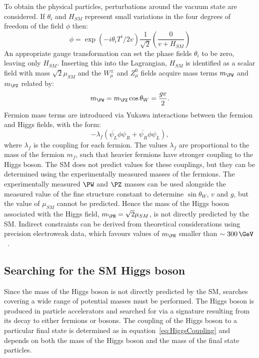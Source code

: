 To obtain the physical particles, perturbations around the vacuum state are
considered. If $\theta_{i}$ and $H_{SM}$ represent small variations in the four
degrees of freedom of the field $\phi$ then:
\begin{equation}
\phi = \exp(-i\theta_{i}T^{i}/2v)\frac{1}{\sqrt{2}}\left(\frac{0}{v+H_{SM}} \right)
\end{equation}
An appropriate gauge transformation can set the phase fields $\theta_{i}$ to be
zero, leaving only $H_{SM}$. Inserting this into the Lagrangian, $H_{SM}$ is
identified as a scalar field with mass $\sqrt{2}\mu_{SM}$ and the $W_{\mu}^{\pm}$
and $Z_{\mu}^{0}$ fields acquire mass terms $m_{\PW}$ and $m_{\PZ}$ related by:
\begin{equation}
m_{\PW} = m_{\PZ}\cos{\theta_{W}}=\frac{gv}{2}.
\label{eq:vaccummw}
\end{equation}
Fermion mass terms are introduced via Yukawa interactions between the fermion
and Higgs fields, with the form:
\begin{equation}
-\lambda_{f}( \overline{\psi_{L}}\phi\psi_{R} +
\overline{\psi_{R}}\phi\psi_{L}),  
\label{eq:HiggsCoupling}
\end{equation}
where $\lambda_{f}$ is the coupling for each fermion. The values $\lambda_{f}$ 
are proportional to the mass of the fermion $m_{f}$, such that heavier fermions have stronger
coupling to the Higgs boson. The \ac{SM} does not predict values for these
couplings, but they can be determined using the experimentally measured masses
of the fermions. The experimentally measured $\PW$ and $\PZ$ masses can be used
alongside the measured value of the fine structure constant to determine
$\sin{\theta_{W}}$, $v$ and $g$, but the value of $\mu_{SM}$ cannot be
predicted. Hence the mass of the Higgs boson associated with the Higgs field,
$m_{\PH}=\sqrt{2}\mu_{SM}$, is not directly predicted by the \ac{SM}. 
Indirect constraints can be derived from theoretical considerations using
precision electroweak data, which favours values of $m_{\PH}$
smaller than $\sim300\,\GeV$~\cite{lepewwg}.

\subsection{Searching for the SM Higgs boson}
\label{sec:LHCSMHiggs}

Since the mass of the Higgs boson is not directly predicted by the \ac{SM},
searches covering a wide range of potential masses must be performed.
The Higgs boson is produced in particle accelerators and searched for via a signature 
resulting from its decay to either fermions or bosons. The coupling of the
Higgs boson to a particular final state is determined as in equation~\ref{eq:HiggsCoupling} and
depends on both the mass of the Higgs boson and the mass of the final state
particles. 

